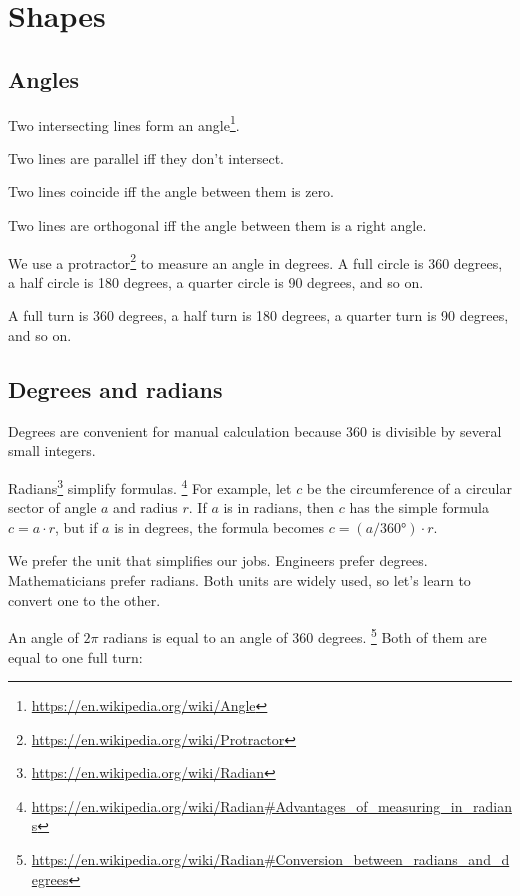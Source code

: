 \chapter{Shapes}

\section{Angles}

Two intersecting lines form an angle\footnote{\url{https://en.wikipedia.org/wiki/Angle}}.

Two lines are parallel iff they don't intersect.

Two lines coincide iff the angle between them is zero.

Two lines are orthogonal iff the angle between them is a right angle.

We use a protractor\footnote{\url{https://en.wikipedia.org/wiki/Protractor}} to measure an angle in degrees.
A full circle is 360 degrees,
a half circle is 180 degrees,
a quarter circle is 90 degrees,
and so on.

A full turn is 360 degrees,
a half turn is 180 degrees,
a quarter turn is 90 degrees,
and so on.

\section*{Degrees and radians}

Degrees are convenient for manual calculation
because 360 is divisible by several small integers.

Radians\footnote{\url{https://en.wikipedia.org/wiki/Radian}} simplify formulas.%
\footnote{\url{https://en.wikipedia.org/wiki/Radian\#Advantages_of_measuring_in_radians}}
For example,
let \(c\) be the circumference of
a circular sector of angle \(a\) and radius \(r\).
If \(a\) is in radians, then \(c\) has the simple formula \(c = a \cdot r\),
but if \(a\) is in degrees, the formula becomes \(c = (a / \ang{360}) \cdot r\).

We prefer the unit that simplifies our jobs.
Engineers prefer degrees.
Mathematicians prefer radians.
Both units are widely used,
so let's learn to convert one to the other.

An angle of \(2\pi\) radians is equal to an angle of \(360\) degrees.%
\footnote{\url{https://en.wikipedia.org/wiki/Radian\#Conversion_between_radians_and_degrees}}
Both of them are equal to one full turn:

